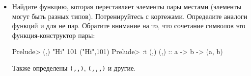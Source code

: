 \begin{itemize}
\item Найдите функцию, которая переставляет элементы 
        пары местами (элементы могут быть разных типов).       
        Потренируйтесь с кортежами. Определите аналоги функций
         и  для не пар. Обратите внимание 
        на то, что сочетание символов \In{(,)} это функция-конструктор
        пары:

\begin{code}
Prelude> (,) "Hi" 101
("Hi",101)
Prelude> :t (,)
(,) :: a -> b -> (a, b)
\end{code}

    Также определены \verb!(,,)!, \verb!(,,,)! и другие. 

\end{itemize}

